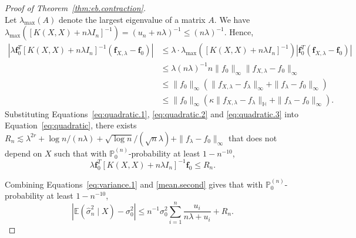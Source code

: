 \documentclass[12pt]{article}
\newcommand{\EE}{\mathbb{E}}
\newcommand{\PP}{\mathbb{P}}
\newcommand{\bbH}{\mathbb{H}}
\theoremstyle{plain}
\theoremstyle{nonitalicremark}
\begin{document}
\begin{appendices}
\begin{proof}[Proof of Theorem~\ref{thm:eb.contraction}]
\begin{equation}
\end{equation}
Let $\lambda_{\max}(A)$ denote the largest eigenvalue of a matrix $A$. We have $\lambda_{\max}([K(X,X)+n\lambda I_n]^{-1})=(u_n+n\lambda)^{-1}\leq (n\lambda)^{-1}$. Hence,
\begin{align}
|\lambda \bm f_0^T [K(X,X)+n\lambda I_n]^{-1} (\bm f_{X, \lambda} - \bm f_0)| &\leq \lambda \cdot \lambda_{\max}([K(X,X)+n\lambda I_n]^{-1}) |\bm f_0^T(\bm f_{X, \lambda} - \bm f_0)|\\
& \leq \lambda (n\lambda)^{-1} n \|f_0\|_\infty \|f_{X,\lambda} - f_0\|_\infty\\
& \leq \|f_0\|_\infty (\|f_{X,\lambda} - f_\lambda\|_\infty + \|f_\lambda - f_0\|_\infty)\\
\label{eq:quadratic.3}& \leq \|f_0\|_\infty ( \kappa \|f_{X,\lambda} - f_\lambda\|_{\bbH} + \|f_\lambda - f_0\|_\infty).
\end{align}
Substituting Equations~\eqref{eq:quadratic.1}, \eqref{eq:quadratic.2} and \eqref{eq:quadratic.3} into Equation~\eqref{eq:quadratic}, there exists $R_n \lesssim \lambda^{2r} + \log n/(n\lambda) + \sqrt{\log n}/(\sqrt{n}\lambda) + \|f_\lambda - f_0\|_\infty$ that does not depend on $X$ such that with $\PP_0^{(n)}$-probability at least $1-n^{-10}$,
\begin{equation}\label{mean.second}
\lambda \bm f_0^T [K(X,X)+n\lambda I_n]^{-1} \bm f_0 \leq R_n.
\end{equation}

Combining Equations~\eqref{eq:variance.1} and \eqref{mean.second} gives that with $\PP_0^{(n)}$-probability at least $1-n^{-10}$,
\begin{equation}
|\EE(\hat{\sigma}^2_n\mid X)-\sigma_0^2|\leq 
n^{-1} \sigma_0^2 \sum_{i=1}^{n}\frac{u_i}{n\lambda+u_i} + R_n.
\end{equation}


\end{proof}
\end{appendices}
\end{document}
